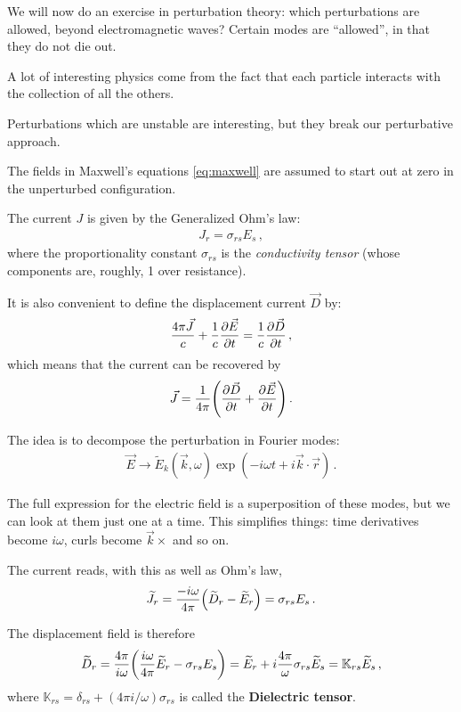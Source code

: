 \documentclass[main.tex]{subfiles}
\begin{document}
We will now do an exercise in perturbation theory: which perturbations are allowed, beyond electromagnetic waves? 
Certain modes are ``allowed'', in that they do not die out. 

A lot of interesting physics come from the fact that each particle interacts with the collection of all the others. 

Perturbations which are unstable are interesting, but they break our perturbative approach. 

The fields in Maxwell's equations \eqref{eq:maxwell} are assumed to start out at zero in the unperturbed configuration. 

The current \(J\) is given by the Generalized Ohm's law: 
%
\begin{align}
J_r = \sigma_{rs} E_s 
\,,
\end{align}
%
where the proportionality constant \(\sigma _{rs}\) is the \emph{conductivity tensor} (whose components are, roughly, 1 over resistance). 

It is also convenient to define the displacement current \(\vec{D}\) by:
%
\begin{align}
\frac{4 \pi \vec{J}}{c} + \frac{1}{c} \pdv{\vec{E}}{t} = \frac{1}{c} \pdv{\vec{D}}{t}
\,,
\end{align}
%
which means that the current can be recovered by 
%
\begin{align}
\vec{J} = \frac{1}{4 \pi } \qty(\pdv{\vec{D}}{t} + \pdv{\vec{E}}{t})
\,.
\end{align}

The idea is to decompose the perturbation in Fourier modes:
%
\begin{align}
 \vec{E} \to \widetilde{E}_k (\vec{k}, \omega ) \exp(- i \omega t + i \vec{k} \cdot \vec{r})
\,.
\end{align}

The full expression for the electric field is a superposition of these modes, but we can look at them just one at a time. 
This simplifies things: time derivatives become \(i \omega \), curls become \(\vec{k} \times \) and so on. 

The current reads, with this as well as Ohm's law,
%
\begin{align}
\widetilde{J} _r = \frac{- i \omega }{4 \pi } \qty(\widetilde{D}_r - \widetilde{E}_r) = \sigma_{rs} E_s
\,.
\end{align}

The displacement field is therefore 
%
\begin{align}
\widetilde{D}_r
= \frac{4 \pi }{ i \omega } \qty(\frac{i \omega }{ 4 \pi } \widetilde{E}_r - \sigma_{rs} E_s) = \widetilde{E}_r
+ i \frac{4 \pi }{\omega } \sigma_{rs} \widetilde{E}_s 
= \mathbb{K}_{rs} \widetilde{E}_s
\,,
\end{align}
%
where \(\mathbb{K}_{rs} = \delta_{rs} + (4 \pi i / \omega ) \sigma_{rs}\) is called the \textbf{Dielectric tensor}.
\end{document}
